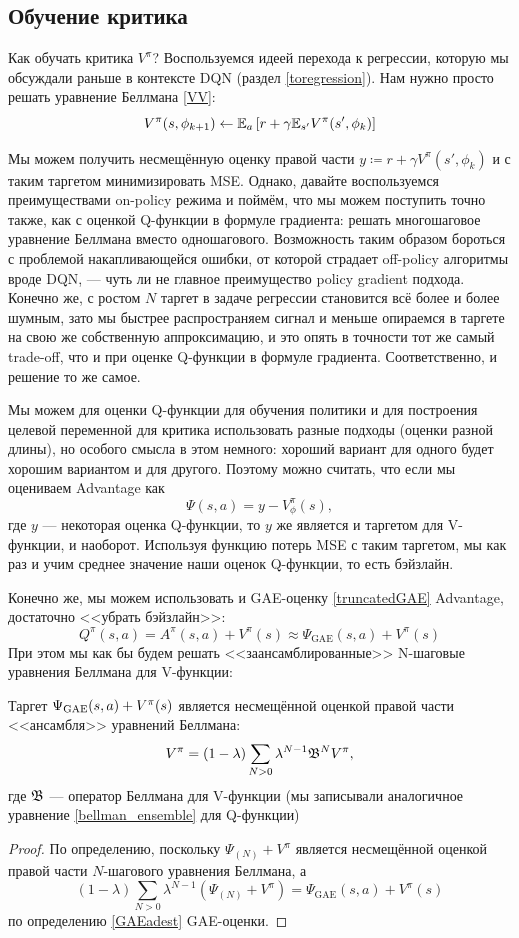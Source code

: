 \subsection{Обучение критика}

Как обучать критика $V^\pi$? Воспользуемся идеей перехода к регрессии, которую мы обсуждали раньше в контексте DQN (раздел \ref{toregression}). Нам нужно просто решать уравнение Беллмана \eqref{VV}:
$$V^\pi(s, \phi_{k+1}) \leftarrow \mathbb{E}_{a} \left[ r + \gamma \mathbb{E}_{s'} V^\pi(s', \phi_k) \right]$$

Мы можем получить несмещённую оценку правой части $y \coloneqq r + \gamma V^\pi(s', \phi_k)$ и с таким таргетом минимизировать MSE. Однако, давайте воспользуемся преимуществами on-policy режима и поймём, что мы можем поступить точно также, как с оценкой Q-функции в формуле градиента: решать многошаговое уравнение Беллмана вместо одношагового. Возможность таким образом бороться с проблемой накапливающейся ошибки, от которой страдает off-policy алгоритмы вроде DQN, --- чуть ли не главное преимущество policy gradient подхода. Конечно же, с ростом $N$ таргет в задаче регрессии становится всё более и более шумным, зато мы быстрее распространяем сигнал и меньше опираемся в таргете на свою же собственную аппроксимацию, и это опять в точности тот же самый trade-off, что и при оценке Q-функции в формуле градиента. Соответственно, и решение то же самое.

Мы можем для оценки Q-функции для обучения политики и для построения целевой переменной для критика использовать разные подходы (оценки разной длины), но особого смысла в этом немного: хороший вариант для одного будет хорошим вариантом и для другого. Поэтому можно считать, что если мы оцениваем Advantage как
$$\Psi(s, a) = y - V_{\phi}^{\pi}(s),$$
где $y$ --- некоторая оценка Q-функции, то $y$ же является и таргетом для V-функции, и наоборот. Используя функцию потерь MSE с таким таргетом, мы как раз и учим среднее значение наши оценок Q-функции, то есть бэйзлайн.

Конечно же, мы можем использовать и GAE-оценку \eqref{truncatedGAE} Advantage, достаточно <<убрать бэйзлайн>>:
$$Q^\pi(s, a) = A^\pi(s, a) + V^\pi(s) \approx \Psi_{\mathrm{GAE}}(s, a) + V^\pi(s)$$
При этом мы как бы будем решать <<заансамблированные>> N-шаговые уравнения Беллмана для V-функции: 

\begin{proposition}
Таргет $\Psi_{\mathrm{GAE}}(s, a) \HM+ V^\pi(s)$ является несмещённой оценкой правой части <<ансамбля>> уравнений Беллмана:
$$V^{\pi} = (1 - \lambda) \sum_{N > 0} \lambda^{N-1} \mathfrak{B}^N V^{\pi},$$
где $\mathfrak{B}$ --- оператор Беллмана для V-функции (мы записывали аналогичное уравнение \eqref{bellman_ensemble} для Q-функции)
\begin{proof}
По определению, поскольку $\Psi_{(N)} + V^{\pi}$ является несмещённой оценкой правой части $N$-шагового уравнения Беллмана, а
$$(1 - \lambda) \sum_{N > 0} \lambda^{N-1} (\Psi_{(N)} + V^{\pi}) = \Psi_{\mathrm{GAE}}(s, a) + V^\pi(s)$$
по определению \eqref{GAEadest} GAE-оценки.
\end{proof}
\end{proposition}


